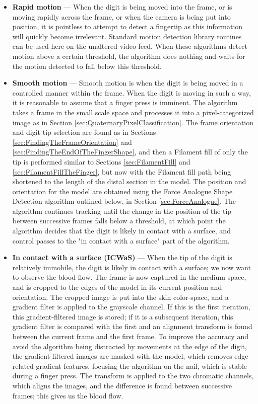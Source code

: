 \begin{itemize}
\item \textbf{Rapid motion} --- When the digit is being moved into the frame, or is moving rapidly across the frame, or when the camera is being put into position, it is pointless to attempt to detect a fingertip as this information will quickly become irrelevant. Standard motion detection library routines can be used here on the unaltered video feed. When these algorithms detect motion above a certain threshold, the algorithm does nothing and waits for the motion detected to fall below this threshold.
\item \textbf{Smooth motion} --- Smooth motion is when the digit is being moved in a controlled manner within the frame. When the digit is moving in such a way, it is reasonable to assume that a finger press is imminent. The algorithm takes a frame in the small scale space and processes it into a pixel-categorized image as in Section \ref{sec:QuaternaryPixelClassification}. The frame orientation and digit tip selection are found as in Sections \ref{sec:FindingTheFrameOrientation} and \ref{sec:FindingTheEndOfTheFingerShape}, and then a Filament fill of only the tip is performed similar to Sections \ref{sec:FilamentFill} and \ref{sec:FilamentFillTheFinger}, but now with the Filament fill path being shortened to the length of the distal section in the model. The position and orientation for the model are obtained using the Force Analogue Shape Detection algorithm outlined below, in Section \ref{sec:ForceAnalogue}. The algorithm continues tracking until the change in the position of the tip between successive frames falls below a threshold, at which point the algorithm decides that the digit is likely in contact with a surface, and control passes to the "in contact with a surface" part of the algorithm.
\item \textbf{In contact with a surface (ICWaS)} --- When the tip of the digit is relatively immobile, the digit is likely in contact with a surface; we now want to observe the blood flow. The frame is now captured in the medium space, and is cropped to the edges of the model in its current position and orientation. The cropped image is put into the skin color-space, and a gradient filter is applied to the grayscale channel. If this is the first iteration, this gradient-filtered image is stored; if it is a subsequent iteration, this gradient filter is compared with the first and an alignment transform is found between the current frame and the first frame. To improve the accuracy and avoid the algorithm being distracted by movements at the edge of the digit, the gradient-filtered images are masked with the model, which removes edge-related gradient features, focusing the algorithm on the nail, which is stable during a finger press. The transform is applied to the two chromatic channels, which aligns the images, and the difference is found between successive frames; this gives us the blood flow. 
\end{itemize}

